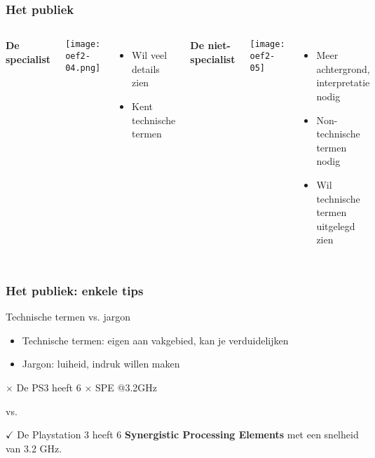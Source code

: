 \documentclass[aspectratio=169]{beamer}
\begin{document}
\begin{frame}
  \frametitle{Het publiek}
  
  \begin{columns}[c]
    
    \centering
    
    \textbf{De specialist}
    
    \texttt{[image: oef2-04.png]}
    
    \begin{itemize}
      \item Wil veel details zien
      \item Kent technische termen
    \end{itemize}
    
    
    \centering
    
    \textbf{De niet-specialist}
    
    \texttt{[image: oef2-05]}
    
    \begin{itemize}
      \item Meer achtergrond, interpretatie nodig
      \item Non-technische termen nodig
      \item Wil technische termen uitgelegd zien
    \end{itemize}
  \end{columns}
\end{frame}

\begin{frame}
  \frametitle{Het publiek: enkele tips}
  
  Technische termen vs. jargon
  
  \begin{itemize}
    \item Technische termen: eigen aan vakgebied, kan je verduidelijken
    \item Jargon: luiheid, indruk willen maken
  \end{itemize}
  
  \vfill
  
  \centering
  
  \textcolor{hgorange}{$\times$ De PS3 heeft 6 $\times$ SPE @3.2GHz}
  
  vs.
  
  \textcolor{hgdarkgreen}{$\checkmark$ De Playstation 3 heeft 6 \textbf{Synergistic Processing Elements} met een snelheid van 3.2 GHz.}
\end{frame}
\end{document}
